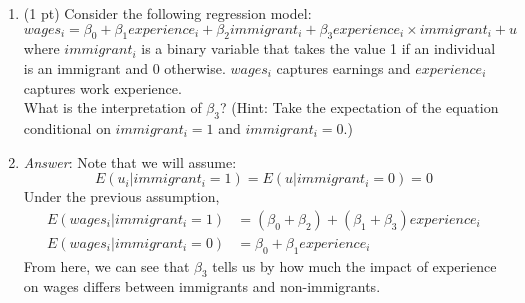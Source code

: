 \documentclass{./../../Latex/handout}
\begin{document}
\begin{enumerate}
\item (1 pt) Consider the following regression model:
$$ wages_i =\beta_0 +  \beta_1  experience_i + \beta_2 immigrant_i +  \beta_3  experience_i \times immigrant_i + u $$
where $immigrant_i$ is a binary variable that takes the value 1 if an individual is an immigrant and 0 otherwise. $wages_i$ captures earnings and $experience_i$ captures work experience. \\
What is the interpretation of $\beta_3$?  (Hint: Take the expectation of the equation conditional on $immigrant_i=1$ and $immigrant_i=0$.)
\item[] \textit{Answer}: Note that we will assume: $$E(u_i | immigrant_i=1)=E(u | immigrant_i=0)=0$$
Under the previous assumption, 
\begin{align*}
	E(wages_i| immigrant_i=1) &= (\beta_0 + \beta_2)  +  (\beta_1+\beta_3)  experience_i \\
	E(wages_i| immigrant_i=0) &=\beta_0 +  \beta_1  experience_i 
\end{align*}
From here, we can see that $\beta_3$ tells us by how much the impact of experience on wages differs between immigrants and non-immigrants. 
\end{enumerate}
\end{document}
